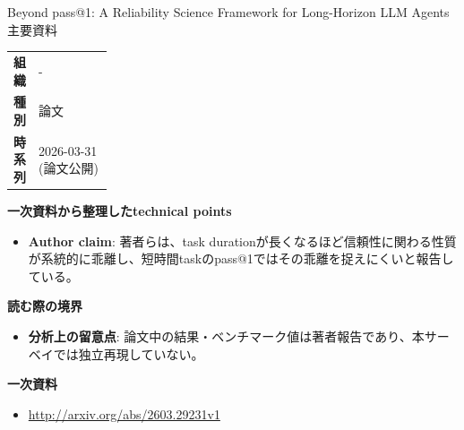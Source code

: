 \begin{technicalnote}{Beyond pass@1: A Reliability Science Framework for Long-Horizon LLM Agents}{主要資料}
\begingroup
\begin{tabularx}{\linewidth}{@{}>{\bfseries}p{0.22\linewidth}X@{}}
組織 & - \\
種別 & 論文 \\
時系列 & 2026-03-31 (論文公開) \\
\end{tabularx}
\smallskip
{\bfseries 一次資料から整理したtechnical points}
\begin{itemize}[leftmargin=1.5em,itemsep=0.35em]
\item \textbf{Author claim}: 著者らは、task durationが長くなるほど信頼性に関わる性質が系統的に乖離し、短時間taskのpass@1ではその乖離を捉えにくいと報告している。
\end{itemize}
\begin{minipage}{\linewidth}
{\bfseries 読む際の境界}
\begin{itemize}[leftmargin=1.5em,itemsep=0.35em]
\item \textbf{分析上の留意点}: 論文中の結果・ベンチマーク値は著者報告であり、本サーベイでは独立再現していない。
\end{itemize}
\begin{samepage}
{\bfseries 一次資料}
\begingroup\sloppy
\begin{itemize}[leftmargin=1.5em,itemsep=0.25em]
\item {\scriptsize\url{http://arxiv.org/abs/2603.29231v1}}
\end{itemize}
\endgroup
\end{samepage}
\end{minipage}
\endgroup
\end{technicalnote}
\medskip

